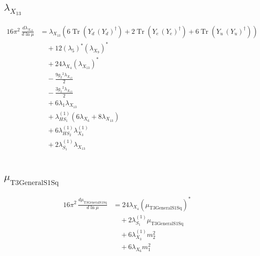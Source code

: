 \documentclass[10pt,a4paper]{article}
\begin{document}
\subsection*{$\lambda_{X_{13}}$}
\begin{align*}
16\pi^2\,\frac{d \lambda_{X_{13}}}{d\ln\mu} &={\lambda_{X_{13}}} (6 \operatorname{Tr}\!\left({Y_d}\,\left({Y_d}\right)^{\dagger}\right)+2 \operatorname{Tr}\!\left({Y_e}\,\left({Y_e}\right)^{\dagger}\right)+6 \operatorname{Tr}\!\left({Y_u}\,\left({Y_u}\right)^{\dagger}\right)) \\
&\quad +12 \left({\lambda_5}\right)^{*} \left({\lambda_{X_{9}}}\right)^{*} \\
&\quad +24 {\lambda_{X_{4}}} \left({\lambda_{X_{13}}}\right)^{*} \\
&\quad -\frac{9 {g_2}^2 {\lambda_{X_{13}}}}{2} \\
&\quad -\frac{3 {g_1}^2 {\lambda_{X_{13}}}}{2} \\
&\quad +6 {\lambda_1} {\lambda_{X_{13}}} \\
&\quad +{\lambda_{HS_1}^{(1)}} (6 {\lambda_{X_{6}}}+8 {\lambda_{X_{13}}}) \\
&\quad +6 {\lambda_{HS_2}^{(1)}} {\lambda_{X_{3}}^{(1)}} \\
&\quad +2 {\lambda_{S_1}^{(1)}} {\lambda_{X_{13}}} \\
\end{align*}
\subsection*{$\mu_{\mathrm{T3GeneralS1Sq}}$}
\begin{align*}
16\pi^2\,\frac{d \mu_{\mathrm{T3GeneralS1Sq}}}{d\ln\mu} &=24 {\lambda_{X_{4}}} \left({\mu_{\mathrm{T3GeneralS1Sq}}}\right)^{*} \\
&\quad +2 {\lambda_{S_1}^{(1)}} {\mu_{\mathrm{T3GeneralS1Sq}}} \\
&\quad +6 {\lambda_{X_{3}}^{(1)}} {m_2^2} \\
&\quad +6 {\lambda_{X_{6}}} {m_1^2} \\
\end{align*}
\end{document}
